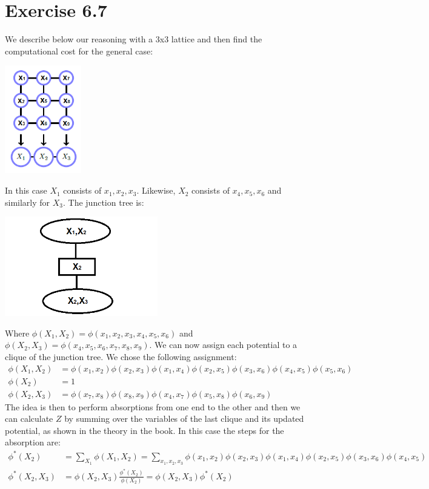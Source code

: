 \documentclass[11pt,a4paper,oneside]{report}
\begin{document}
\section*{Exercise 6.7}

We describe below our reasoning with a 3x3 lattice and then find the computational cost for the general case:

	\begin{center} \includegraphics[width=0.25\textwidth]{c6e7temp}\end{center}  
	
	In this case $X_1$ consists of $x_1,x_2,x_3$. Likewise, $X_2$ consists of $x_4,x_5,x_6$ and similarly for $X_3$. The junction tree is:
	
	\begin{center} \includegraphics[width=0.5\textwidth]{c6e7clique}\end{center}  

Where $\phi(X_1,X_2) = \phi(x_1,x_2,x_3,x_4,x_5,x_6)$ and $\phi(X_2,X_3) = \phi(x_4,x_5,x_6,x_7,x_8,x_9)$. We can now assign each potential to a clique of the junction tree. We chose the following assignment:
\begin{align*}
\phi(X_1,X_2) &= \phi(x_1,x_2)\phi(x_2,x_3)\phi(x_1,x_4)\phi(x_2,x_5)\phi(x_3,x_6)\phi(x_4,x_5)\phi(x_5,x_6)\\
\phi(X_2) &= 1\\
\phi(X_2,X_3) &= \phi(x_7,x_8)\phi(x_8,x_9)\phi(x_4,x_7)\phi(x_5,x_8)\phi(x_6,x_9)
\end{align*}
The idea is then to perform absorptions from one end to the other and then we can calculate $Z$ by summing over the variables of the last clique and its updated potential, as shown in the theory in the book. In this case the steps for the absorption are:
\begin{align*}
\phi^\ast(X_2) &= \sum_{X_1}\phi(X_1,X_2) = \sum_{x_1,x_2,x_3}\phi(x_1,x_2)\phi(x_2,x_3)\phi(x_1,x_4)\phi(x_2,x_5)\phi(x_3,x_6)\phi(x_4,x_5)\\
\phi^\ast(X_2,X_3) &= \phi(X_2,X_3)\frac{\phi^\ast(X_2)}{\phi(X_2)}=\phi(X_2,X_3)\phi^\ast(X_2)
\end{align*}
\end{document}
